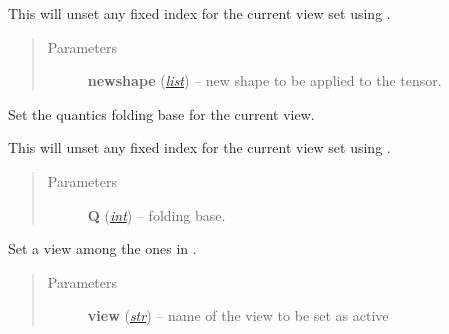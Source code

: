 \documentclass[a4paper,10pt,english]{sphinxmanual}
\begin{document}
\begin{fulllineitems}
\begin{fulllineitems}
This will unset any fixed index for the current view set using .
\begin{quote}\begin{description}
\item[{Parameters}] \leavevmode
\textbf{newshape} (\href{http://docs.python.org/library/functions.html\#list}{\emph{list}}) -- new shape to be applied to the tensor.

\end{description}\end{quote}

\end{fulllineitems}


\begin{fulllineitems}
\label{api-tw:TensorToolbox.core.TensorWrapper.set_Q}
Set the quantics folding base for the current view.

This will unset any fixed index for the current view set using .
\begin{quote}\begin{description}
\item[{Parameters}] \leavevmode
\textbf{Q} (\href{http://docs.python.org/library/functions.html\#int}{\emph{int}}) -- folding base.

\end{description}\end{quote}

\end{fulllineitems}


\begin{fulllineitems}
\label{api-tw:TensorToolbox.core.TensorWrapper.set_active_view}
Set a view among the ones in .
\begin{quote}\begin{description}
\item[{Parameters}] \leavevmode
\textbf{view} (\href{http://docs.python.org/library/functions.html\#str}{\emph{str}}) -- name of the view to be set as active

\end{description}\end{quote}

\end{fulllineitems}


\end{fulllineitems}
\end{document}
